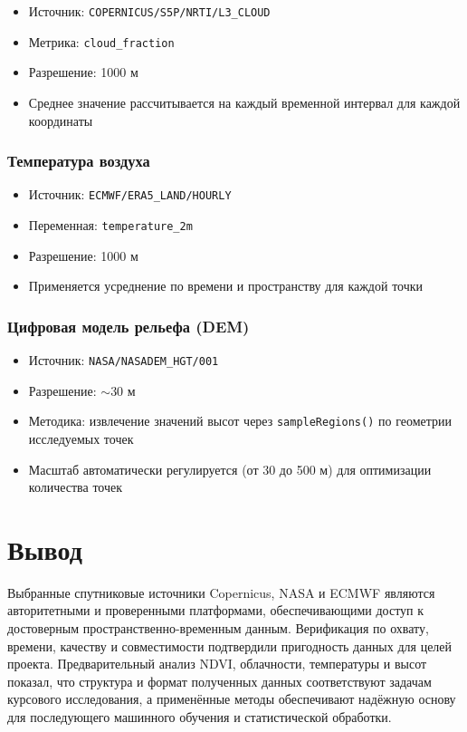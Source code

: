 \begin{itemize}
	\item Источник: \texttt{COPERNICUS/S5P/NRTI/L3\_CLOUD}
	\item Метрика: \texttt{cloud\_fraction}
	\item Разрешение: 1000 м
	\item Среднее значение рассчитывается на каждый временной интервал для каждой координаты
\end{itemize}

\subsubsection*{Температура воздуха}

\begin{itemize}
	\item Источник: \texttt{ECMWF/ERA5\_LAND/HOURLY}
	\item Переменная: \texttt{temperature\_2m}
	\item Разрешение: 1000 м
	\item Применяется усреднение по времени и пространству для каждой точки
\end{itemize}

\subsubsection*{Цифровая модель рельефа (DEM)}

\begin{itemize}
	\item Источник: \texttt{NASA/NASADEM\_HGT/001}
	\item Разрешение: $\sim$30 м
	\item Методика: извлечение значений высот через \texttt{sampleRegions()} по геометрии исследуемых точек
	\item Масштаб автоматически регулируется (от 30 до 500 м) для оптимизации количества точек
\end{itemize}

\section*{Вывод}

Выбранные спутниковые источники Copernicus, NASA и ECMWF являются авторитетными и проверенными платформами, обеспечивающими доступ к достоверным пространственно-временным данным. Верификация по охвату, времени, качеству и совместимости подтвердили пригодность данных для целей проекта. Предварительный анализ NDVI, облачности, температуры и высот показал, что структура и формат полученных данных соответствуют задачам курсового исследования, а применённые методы обеспечивают надёжную основу для последующего машинного обучения и статистической обработки.
